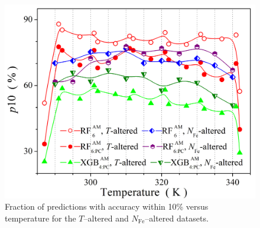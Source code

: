 \documentclass[a4paper,fleqn]{cas-sc}
\begin{document}
\begin{figure}
  \centering
     \includegraphics[width=0.7\linewidth]{Fig10.png}
    \caption{Fraction of predictions with accuracy within 10\% versus temperature for the $T$--altered and $N_\mathrm{Fe}$--altered datasets.
}\label{fig10}
\end{figure}
\end{document}
